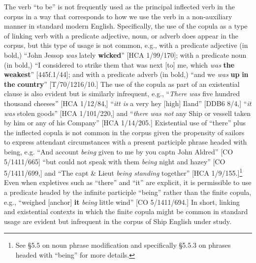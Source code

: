 The verb “to be” is not frequently used as the principal inflected verb in the corpus in a way that corresponds to how we use the verb in a non-auxiliary manner in standard modern English. Specifically, the use of the copula as a type of linking verb with a predicate adjective, noun, or adverb does appear in the corpus, but this type of usage is not common, e.g., with a predicate adjective (in bold,) “John Jessop \textit{was} lately \textbf{wicked}” [HCA 1/99/170]; with a predicate noun (in bold,) “I considered to strike them that was next [to] me, which \textit{was} \textbf{the} \textbf{weakest}” [445f.1/44]; and with a predicate adverb (in bold,) “and we \textit{was} \textbf{up} \textbf{in} \textbf{the} \textbf{country}” [T/70/1216/10.] The use of the copula as part of an existential clause is also evident but is similarly infrequent, e.g., “\textit{There was} five hundred thousand cheeses” [HCA 1/12/84,] “\textit{itt is} a very hey [high] Iland” [DDB6 8/4,] “\textit{it was} stolen goods” [HCA 1/101/220,] and “\textit{there was not} any Ship or vessell taken by him or any of his Company” [HCA 1/14/205.] Existential use of “there” plus the inflected copula is not common in the corpus given the propensity of sailors to express attendant circumstances with a present participle phrase headed with being, e.g. “And account \textit{being} given to me by you captn John Aldred” [CO 5/1411/665] “but could not speak with them \textit{being} night and hazey” [CO 5/1411/699,] and “The capt \& Lieut \textit{being standing} together” [HCA 1/9/155.]\footnote{See §5.5 on noun phrase modification and specifically §5.5.3 on phrases headed with “being” for more details.} Even when expletives such as “there” and “it” are explicit, it is permissible to use a predicate headed by the infinite participle “being” rather than the finite copula, e.g., “weighed [anchor] \textbf{it} \textit{being} little wind” [CO 5/1411/694.] In short, linking and existential contexts in which the finite copula might be common in standard usage are evident but infrequent in the corpus of Ship English under study. 

